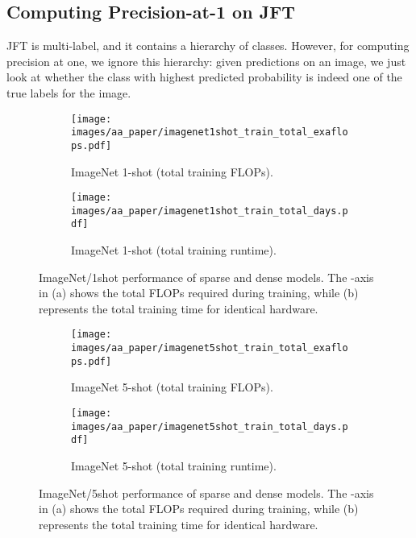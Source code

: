 \documentclass{article}
\begin{document}
\subsection{Computing Precision-at-1 on JFT}\label{sec:prec_at_1_jft}
JFT is multi-label, and it contains a hierarchy of classes.
However, for computing precision at one, we ignore this hierarchy: given predictions on an image, we just look at whether the class with highest predicted probability is indeed one of the true labels for the image.

\begin{figure}
\centering
\begin{subfigure}{.50\textwidth}
  \centering
  \texttt{[image: images/aa\_paper/imagenet1shot\_train\_total\_exaflops.pdf]}
  \caption{ImageNet 1-shot (total training FLOPs).}
  \label{im:fewshot_1_flops}
\end{subfigure}\begin{subfigure}{.50\textwidth}
  \centering
  \texttt{[image: images/aa\_paper/imagenet1shot\_train\_total\_days.pdf]}
  \caption{ImageNet 1-shot (total training runtime).}
  \label{im:fewshot_1_runtime}
\end{subfigure}
\caption{
ImageNet/1shot performance of sparse and dense models.
The -axis in (a) shows the total FLOPs required during training, while (b) represents the total training time for identical hardware.
}
\label{im:fewshot_1_flops_and_runtime}
\end{figure}


\begin{figure}
\centering
\begin{subfigure}{.50\textwidth}
  \centering
  \texttt{[image: images/aa\_paper/imagenet5shot\_train\_total\_exaflops.pdf]}
  \caption{ImageNet 5-shot (total training FLOPs).}
  \label{im:fewshot_5_flops}
\end{subfigure}\begin{subfigure}{.50\textwidth}
  \centering
  \texttt{[image: images/aa\_paper/imagenet5shot\_train\_total\_days.pdf]}
  \caption{ImageNet 5-shot (total training runtime).}
  \label{im:fewshot_5_runtime}
\end{subfigure}
\caption{
ImageNet/5shot performance of sparse and dense models.
The -axis in (a) shows the total FLOPs required during training, while (b) represents the total training time for identical hardware.
}
\label{im:fewshot_5_flops_and_runtime}
\end{figure}
\end{document}
